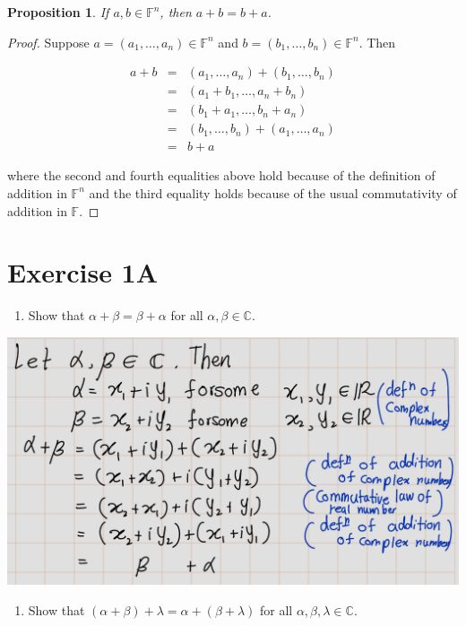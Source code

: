 \documentclass[
]{book}
\providecommand{\tightlist}{%
  \setlength{\itemsep}{0pt}\setlength{\parskip}{0pt}}
\newtheorem{proposition}{Proposition}[chapter]
\theoremstyle{definition}
\theoremstyle{definition}
\theoremstyle{definition}
\theoremstyle{definition}
\theoremstyle{remark}
\begin{document}
\begin{proposition}
\protect\hypertarget{prp:unnamed-chunk-12}{}\label{prp:unnamed-chunk-12}If \(a, b \in \mathbb{F}^n\), then \(a+b=b+a\).
\end{proposition}

\begin{proof}
Suppose \(a = (a_1, …, a_n) \in \mathbb{F}^n\) and \(b = (b_1, …, b_n) \in \mathbb{F}^n\). Then

\begin{eqnarray}
a+b
&=& (a_1,…,a_n) + (b_1,…,b_n)\\
&=& (a_1 + b_1, …, a_n + b_n)\\
&=& (b_1 + a_1, …, b_n + a_n)\\
&=& (b_1,…,b_n) + (a_1,…,a_n)\\
&=& b+a
\end{eqnarray}

where the second and fourth equalities above hold because of the definition of addition in \(\mathbb{F}^n\) and the third equality holds because of the usual commutativity of addition in \(\mathbb{F}\).
\end{proof}

\chapter{Exercise 1A}\label{exercise-1a}

\begin{enumerate}
\def\labelenumi{\arabic{enumi}.}
\tightlist
\item
  Show that \(\alpha + \beta = \beta + \alpha\) for all \(\alpha, \beta \in \mathbb{C}\).
\end{enumerate}

\includegraphics[width=17.65in]{fig/Ex1A/Ex1}

\begin{enumerate}
\def\labelenumi{\arabic{enumi}.}
\setcounter{enumi}{1}
\tightlist
\item
  Show that \((\alpha + \beta) + \lambda = \alpha + (\beta + \lambda)\) for all \(\alpha, \beta, \lambda \in \mathbb{C}\).
\end{enumerate}
\end{document}
